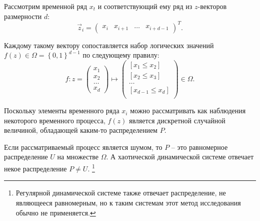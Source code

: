 
Рассмотрим временной ряд $x_t$ и соответствующий ему ряд из $z$-векторов размерности $d$:
\begin{equation*}
    \vec z_i = \begin{pmatrix}
        x_i & x_{i+1} & \dots & x_{i+d-1}
    \end{pmatrix}^T.
\end{equation*}

Каждому такому вектору сопоставляется набор логических значений $f(z) \in \Omega = \left\{ 0, 1 \right\}^{d-1}$ по следующему правилу:
\begin{equation*}
    f:
    z = \begin{pmatrix}
        x_{1} \\ x_{2} \\ \dots \\ x_{d}
    \end{pmatrix}
    \mapsto
    \begin{pmatrix}
        \left[ x_1 \leq x_2 \right] \\
        \left[ x_2 \leq x_3 \right] \\
        \dots \\
        \left[ x_{d-1} \leq x_{d} \right] \\
    \end{pmatrix}
    \in \Omega.
\end{equation*}

Поскольку элементы временного ряда $x_i$ можно рассматривать как наблюдения некоторого временного процесса, $f(z)$ является дискретной случайной величиной, обладающей каким-то распределением $P$.

Если рассматриваемый процесс является шумом, то $P$ -- это равномерное распределение $U$ на множестве $\Omega$.
А хаотической динамической системе отвечает некое распределение $P \neq U$.
\footnote{Регулярной динамической системе также отвечает распределение, не являющееся равномерным, но к таким системам этот метод исследования обычно не применяется.}

